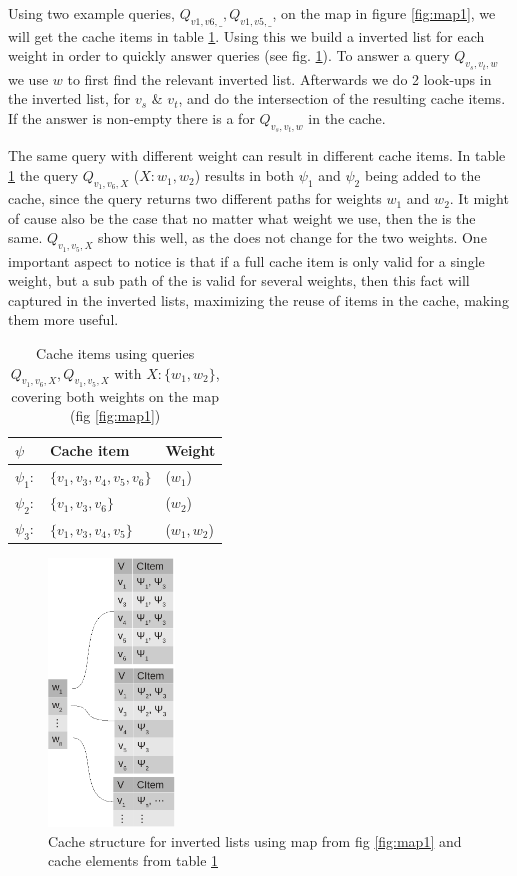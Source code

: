 Using two example queries, $Q_{v1,v6,\_}, Q_{v1,v5,\_}$, on the map in figure \ref{fig:map1}, we will get the cache items in table \ref{tab:expsi}. Using this we build a inverted list for each weight in order to quickly answer queries (see fig. \ref{fig:wilist}). 
To answer a query $Q_{v_s,v_t,w}$ we use $w$ to first find the relevant inverted list. Afterwards we do 2 look-ups in the inverted list, for $v_s$ \& $v_t$, and do the intersection of the resulting cache items. If the answer is non-empty there is a \spath for $Q_{v_s,v_t,w}$ in the cache.

The same query with different weight can result in different cache items. In table \ref{tab:expsi} the query $Q_{v_1,v_6,X}$ ($X: w_1,w_2$) results in both $\psi_1$ and $\psi_2$ being added to the cache, since the query returns two different paths for weights $w_1$ and $w_2$. It might of cause also be the case that no matter what weight we use, then the \spath is the same. $Q_{v_1,v_5,X}$ show this well, as the \spath does not change for the two weights. One important aspect to notice is that if a full cache item is only valid for a single weight, but a sub path of the \spath is valid for several weights, then this fact will captured in the inverted lists, maximizing the reuse of items in the cache, making them more useful. 



\begin{table}
\begin{tabular}{l|l|l}\hline
$\psi$		& Cache item 			& Weight \\\hline  \hline
$\psi_1:$	& $\{v_1,v_3,v_4,v_5,v_6\}$ 	& ($w_1$)\\\hline
$\psi_2:$	& $\{v_1,v_3,v_6\}$ 		& ($w_2$)\\\hline
$\psi_3:$	& $\{v_1,v_3,v_4,v_5\}$ 	& ($w_1,w_2$)\\\hline
\end{tabular}
\caption{Cache items using queries $Q_{v_1,v_6,X}, Q_{v_1,v_5,X}$ with $X:\{w_1,w_2\}$, covering both weights on the map (fig \ref{fig:map1})}
\label{tab:expsi}
\end{table}


\begin{figure}[hbt]
  \center
        \includegraphics[width=0.3\textwidth]{figures/wilist}
        \caption{Cache structure for inverted lists using map from fig \ref{fig:map1} and cache elements from table \ref{tab:expsi}}
  \label{fig:wilist}
\end{figure}

